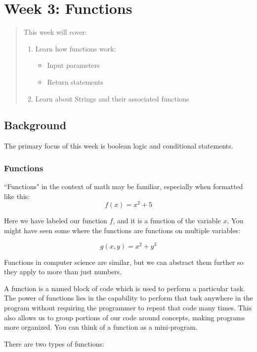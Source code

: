 \chapter*{Week 3: Functions}
\setcounter{chapter}{3}
\setcounter{section}{0}

\begin{abstract}
This week will cover:
\begin{enumerate}
    \item Learn how functions work:
    \begin{itemize}
        \item Input parameters
        \item Return statements
    \end{itemize}
    \item Learn about Strings and their associated functions
\end{enumerate}
    
\end{abstract}

\section{Background}
The primary focus of this week is boolean logic and conditional statements. 

\subsection{Functions}
``Functions" in the context of math may be familiar, especially when formatted like this:
$$f(x) = x^2 + 5$$

Here we have labeled our function $f$, and it is a function of the variable $x$. You might have seen some where the functions are functions on multiple variables:

$$g(x,y) = x^2+y^3$$

Functions in computer science are similar, but we can abstract them further so they apply to more than just numbers. 

A function is a named block of code which is used to perform a particular task. The power of functions lies in the capability to perform that task anywhere in the program without requiring the programmer to repeat that code many times. This also allows us to group portions of our code around concepts, making programs more organized. You can think of a function as a mini-program.

There are two types of functions:

